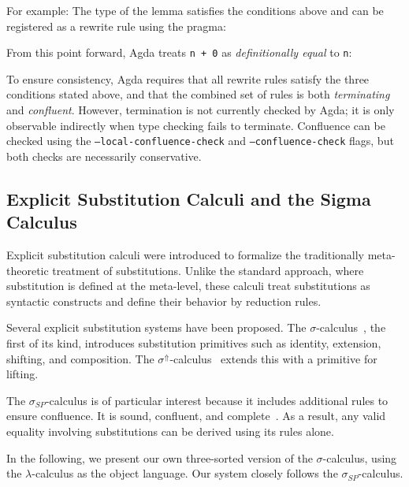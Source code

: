\documentclass[screen,nonacm]{acmart}
\begin{document}
For example: \ERewrite{} The type of the lemma satisfies the conditions above
and can be registered as a rewrite rule using the  pragma:
\ERewriteIt{}

From this point forward, Agda treats \verb|n + 0| as \emph{definitionally
      equal} to \verb|n|: \ERewriteEx

To ensure consistency, Agda requires that all rewrite rules satisfy the three
conditions stated above, and that the combined set of rules is both
\emph{terminating} and \emph{confluent}. However, termination is not currently
checked by Agda; it is only observable indirectly when type checking fails to
terminate. Confluence can be checked using the
\texttt{--local-confluence-check} and \texttt{--confluence-check} flags, but
both checks are necessarily conservative.

\subsection{Explicit Substitution Calculi and the Sigma Calculus}\label{sec:pre-sig}

Explicit substitution calculi were introduced to formalize the traditionally
meta-theoretic treatment of substitutions. Unlike the standard approach, where
substitution is defined at the meta-level, these calculi treat substitutions as
syntactic constructs and define their behavior by reduction rules.

Several explicit substitution systems have been proposed. The
$\sigma$-calculus~\cite{CITE3}, the first of its kind, introduces substitution
primitives such as identity, extension, shifting, and composition. The
$\sigma^\Uparrow$-calculus~\cite{CITE4} extends this with a primitive for
lifting.

The $\sigma_{SP}$-calculus is of particular interest because it includes
additional rules to ensure confluence. It is sound, confluent, and
complete~\cite{CITE}. As a result, any valid equality involving substitutions
can be derived using its rules alone.

In the following, we present our own three-sorted version of the
$\sigma$-calculus, using the $\lambda$-calculus as the object language. Our
system closely follows the $\sigma_{SP}$-calculus.
\end{document}
